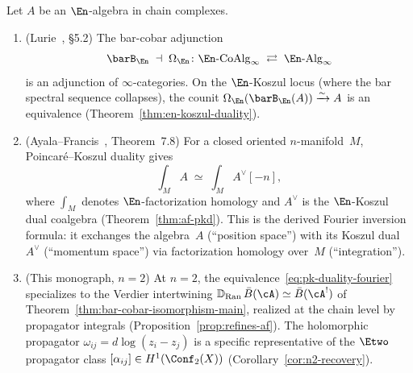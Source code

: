 \begin{theorem}
\label{thm:derived-fourier}
Let $A$ be an $\En$-algebra in chain complexes.
\begin{enumerate}[label=\textup{(\roman*)}]
\item \textup{(Lurie~\cite{HA}, \S5.2)}\quad
  The bar-cobar adjunction
  \[
  \barB_{\En} \;\dashv\; \Omega_{\En}
  \colon
  \En\text{-}\mathrm{CoAlg}_\infty
  \;\rightleftarrows\;
  \En\text{-}\mathrm{Alg}_\infty
  \]
  is an adjunction of\/ $\infty$-categories.  On the
  $\En$-Koszul locus (where the bar spectral sequence
  collapses), the counit
  $\Omega_{\En}(\barB_{\En}(A)) \xrightarrow{\sim} A$
  is an equivalence
  \textup{(}Theorem~\textup{\ref{thm:en-koszul-duality})}.

\item \textup{(Ayala--Francis~\cite{AF15}, Theorem~7.8)}\quad
  For a closed oriented $n$-manifold~$M$,
  Poincar\'e--Koszul duality gives
  \begin{equation}\label{eq:pk-duality-fourier}
  \int_M A
  \;\simeq\;
  \int_M A^{\vee}[-n],
  \end{equation}
  where $\int_M$ denotes $\En$-factorization homology and
  $A^\vee$ is the $\En$-Koszul dual coalgebra
  \textup{(}Theorem~\textup{\ref{thm:af-pkd})}.  This is the
  derived Fourier inversion formula: it exchanges the algebra~$A$
  (``position space'') with its Koszul dual~$A^\vee$ (``momentum
  space'') via factorization homology over~$M$ (``integration'').

\item \textup{(This monograph, $n = 2$)}\quad
  At $n = 2$, the equivalence~\eqref{eq:pk-duality-fourier}
  specializes to the Verdier intertwining
  $\mathbb{D}_{\mathrm{Ran}}\, \bar{B}(\cA) \simeq \bar{B}(\cA^!)$
  of Theorem~\textup{\ref{thm:bar-cobar-isomorphism-main}},
  realized at the chain level by propagator integrals
  \textup{(}Proposition~\textup{\ref{prop:refines-af})}.
  The holomorphic propagator $\omega_{ij} = d\log(z_i - z_j)$
  is a specific representative of the $\Etwo$ propagator class
  $[\alpha_{ij}] \in H^1(\Conf_2(X))$
  \textup{(}Corollary~\textup{\ref{cor:n2-recovery})}.
\end{enumerate}
\end{theorem}

